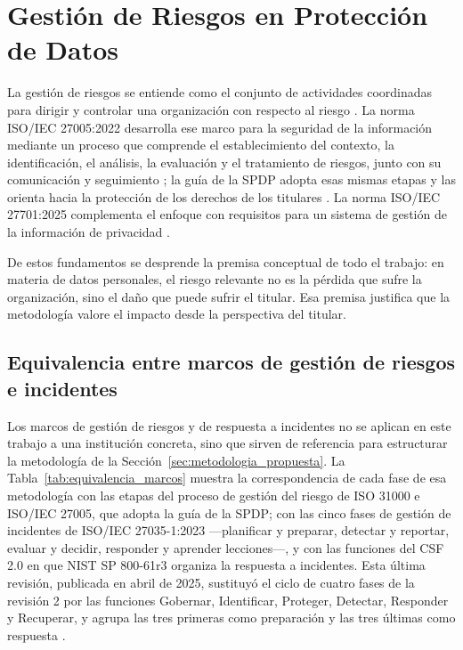 \section{Gestión de Riesgos en Protección de Datos}
\label{sec:marcos_referencia}

La gestión de riesgos se entiende como el conjunto de actividades coordinadas para dirigir y controlar una organización con respecto al riesgo \cite{iso31000_2018}. La norma ISO/IEC 27005:2022 desarrolla ese marco para la seguridad de la información mediante un proceso que comprende el establecimiento del contexto, la identificación, el análisis, la evaluación y el tratamiento de riesgos, junto con su comunicación y seguimiento \cite{iso27005_2022}; la guía de la SPDP adopta esas mismas etapas y las orienta hacia la protección de los derechos de los titulares \cite{spdp2025guia}. La norma ISO/IEC 27701:2025 complementa el enfoque con requisitos para un sistema de gestión de la información de privacidad \cite{iso27701_2025}.

De estos fundamentos se desprende la premisa conceptual de todo el trabajo: en materia de datos personales, el riesgo relevante no es la pérdida que sufre la organización, sino el daño que puede sufrir el titular. Esa premisa justifica que la metodología valore el impacto desde la perspectiva del titular.

\subsection{Equivalencia entre marcos de gestión de riesgos e incidentes}
\label{sec:equivalencia_marcos}

Los marcos de gestión de riesgos y de respuesta a incidentes no se aplican en este trabajo a una institución concreta, sino que sirven de referencia para estructurar la metodología de la Sección~\ref{sec:metodologia_propuesta}. La Tabla~\ref{tab:equivalencia_marcos} muestra la correspondencia de cada fase de esa metodología con las etapas del proceso de gestión del riesgo de ISO 31000 e ISO/IEC 27005, que adopta la guía de la SPDP; con las cinco fases de gestión de incidentes de ISO/IEC 27035-1:2023 ---planificar y preparar, detectar y reportar, evaluar y decidir, responder y aprender lecciones---, y con las funciones del CSF 2.0 en que NIST SP 800-61r3 organiza la respuesta a incidentes. Esta última revisión, publicada en abril de 2025, sustituyó el ciclo de cuatro fases de la revisión 2 por las funciones Gobernar, Identificar, Proteger, Detectar, Responder y Recuperar, y agrupa las tres primeras como preparación y las tres últimas como respuesta \cite{nist2025sp80061r3}.

